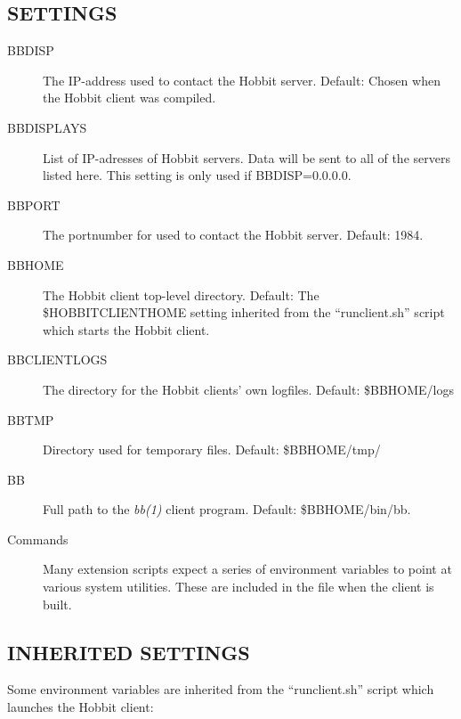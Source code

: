  
\subsection{SETTINGS}

\begin{description}

\item[BBDISP] The IP-address used to contact the Hobbit
  server. Default: Chosen when the Hobbit client was compiled. 


 

\item[BBDISPLAYS] List of IP-adresses of Hobbit servers. Data will be
  sent to all of the servers listed here. This setting is only used if
  BBDISP=0.0.0.0. 


 

\item[BBPORT] The portnumber for used to contact the Hobbit server. Default: 1984. 

 

\item[BBHOME] The Hobbit client top-level directory. Default: The
  \$HOBBITCLIENTHOME setting inherited from the ``runclient.sh''
  script which starts the Hobbit client. 


 

\item[BBCLIENTLOGS] The directory for the Hobbit clients' own logfiles. Default: \$BBHOME/logs 

 

\item[BBTMP] Directory used for temporary files. Default: \$BBHOME/tmp/ 

 

\item[BB] Full path to the \emph{bb(1)}
 client program. Default: \$BBHOME/bin/bb. 

 

\item[Commands] Many extension scripts expect a series of environment
  variables to point at various system utilities. These are included
  in the file when the client is built. 



\end{description}

\subsection{INHERITED SETTINGS}
 Some environment variables are inherited from the ``runclient.sh'' script which launches the Hobbit client: 


